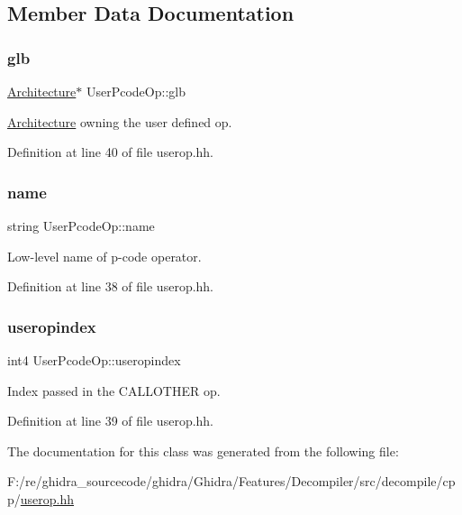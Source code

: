 \subsection{Member Data Documentation}
\mbox{\label{class_user_pcode_op_a38b36d24c48e4618c20ec3c56b90e6d7}} 
\subsubsection{\texorpdfstring{glb}{glb}}
{\footnotesize\ttfamily \mbox{\hyperlink{class_architecture}{Architecture}}$\ast$ User\+Pcode\+Op\+::glb\hspace{0.3cm}{\ttfamily [protected]}}



\mbox{\hyperlink{class_architecture}{Architecture}} owning the user defined op. 



Definition at line 40 of file userop.\+hh.

\mbox{\label{class_user_pcode_op_acb610a4cec8ff71dc665819de35c420e}} 
\subsubsection{\texorpdfstring{name}{name}}
{\footnotesize\ttfamily string User\+Pcode\+Op\+::name\hspace{0.3cm}{\ttfamily [protected]}}



Low-\/level name of p-\/code operator. 



Definition at line 38 of file userop.\+hh.

\mbox{\label{class_user_pcode_op_a07ff8241ba9760ead296a62a8b51e8ad}} 
\subsubsection{\texorpdfstring{useropindex}{useropindex}}
{\footnotesize\ttfamily int4 User\+Pcode\+Op\+::useropindex\hspace{0.3cm}{\ttfamily [protected]}}



Index passed in the C\+A\+L\+L\+O\+T\+H\+ER op. 



Definition at line 39 of file userop.\+hh.



The documentation for this class was generated from the following file\+:\begin{DoxyCompactItemize}
\item 
F\+:/re/ghidra\+\_\+sourcecode/ghidra/\+Ghidra/\+Features/\+Decompiler/src/decompile/cpp/\mbox{\hyperlink{userop_8hh}{userop.\+hh}}\end{DoxyCompactItemize}
